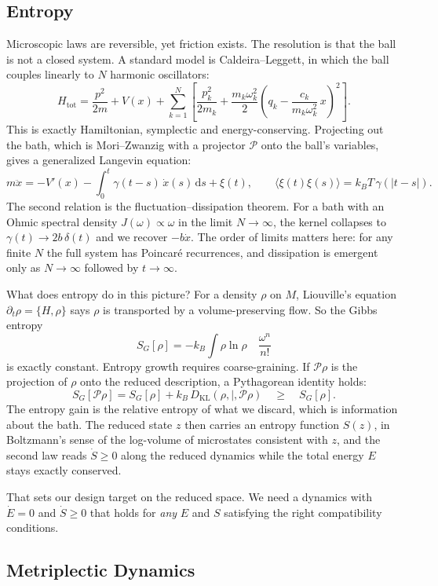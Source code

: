 \subsection{Entropy}

Microscopic laws are reversible, yet friction exists. The resolution is that the ball is not a closed system. A standard model is Caldeira--Leggett, in which the ball couples linearly to $N$ harmonic oscillators:
\[
	H_{\mathrm{tot}} = \frac{p^2}{2m} + V(x) + \sum_{k=1}^{N}\left[\frac{p_k^2}{2m_k} + \frac{m_k\omega_k^2}{2}\left(q_k - \frac{c_k}{m_k\omega_k^2}\,x\right)^2\right].
\]
This is exactly Hamiltonian, symplectic and energy-conserving. Projecting out the bath, which is Mori--Zwanzig with a projector $\mathcal{P}$ onto the ball's variables, gives a generalized Langevin equation:
\[
	m\ddot x = -V'(x) - \int_0^t \gamma(t-s)\,\dot x(s)\,\mathrm{d}s + \xi(t),
	\qquad \langle \xi(t)\xi(s)\rangle = k_B T\,\gamma(|t-s|).
\]
The second relation is the fluctuation--dissipation theorem. For a bath with an Ohmic spectral density $J(\omega)\propto\omega$ in the limit $N\to\infty$, the kernel collapses to $\gamma(t)\to 2b\,\delta(t)$ and we recover $-b\dot x$. The order of limits matters here: for any finite $N$ the full system has Poincar\'e recurrences, and dissipation is emergent only as $N\to\infty$ followed by $t\to\infty$.

What does entropy do in this picture? For a density $\rho$ on $M$, Liouville's equation $\partial_t\rho = \{H,\rho\}$ says $\rho$ is transported by a volume-preserving flow. So the Gibbs entropy
\[
	S_G[\rho] = -k_B\int \rho\ln\rho \quad \frac{\omega^n}{n!}
\]
is exactly constant. Entropy growth requires coarse-graining. If $\mathcal{P}\rho$ is the projection of $\rho$ onto the reduced description, a Pythagorean identity holds:
\[
	S_G[\mathcal{P}\rho] = S_G[\rho] + k_B\, D_{\mathrm{KL}}(\rho,\text{|} ,\mathcal{P}\rho) \quad \ge \quad S_G[\rho].
\]
The entropy gain is the relative entropy of what we discard, which is information about the bath. The reduced state $z$ then carries an entropy function $S(z)$, in Boltzmann's sense of the log-volume of microstates consistent with $z$, and the second law reads $\dot S\ge 0$ along the reduced dynamics while the total energy $E$ stays exactly conserved.

That sets our design target on the reduced space. We need a dynamics with $\dot{E} = 0$ and $\dot S \ge 0$ that holds for \emph{any} $E$ and $S$ satisfying the right compatibility conditions.


\subsection{Metriplectic Dynamics}

